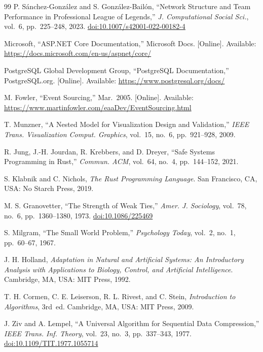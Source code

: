 \begin{thebibliography}{99}
P. Sánchez-González and S. González-Bailón,
``Network Structure and Team Performance in Professional League of Legends,''
\textit{J. Computational Social Sci.}, vol.~6, pp.~225--248, 2023.
\href{https://doi.org/10.1007/s42001-022-00182-4}{doi:10.1007/s42001-022-00182-4}

Microsoft, ``ASP.NET Core Documentation,'' Microsoft Docs. [Online]. Available:
\url{https://docs.microsoft.com/en-us/aspnet/core/}

PostgreSQL Global Development Group, ``PostgreSQL Documentation,''
PostgreSQL.org. [Online]. Available: \url{https://www.postgresql.org/docs/}

M. Fowler, ``Event Sourcing,'' Mar.\ 2005. [Online]. Available:
\url{https://www.martinfowler.com/eaaDev/EventSourcing.html}

T. Munzner, ``A Nested Model for Visualization Design and Validation,''
\textit{IEEE Trans. Visualization Comput. Graphics}, vol.~15, no.~6, pp.~921--928, 2009.

R. Jung, J.-H. Jourdan, R. Krebbers, and D. Dreyer,
``Safe Systems Programming in Rust,''
\textit{Commun. ACM}, vol.~64, no.~4, pp.~144--152, 2021.

S. Klabnik and C. Nichols, \textit{The Rust Programming Language}.
San Francisco, CA, USA: No Starch Press, 2019.

M. S. Granovetter, ``The Strength of Weak Ties,''
\textit{Amer. J. Sociology}, vol.~78, no.~6, pp.~1360--1380, 1973.
\href{https://doi.org/10.1086/225469}{doi:10.1086/225469}

S. Milgram, ``The Small World Problem,''
\textit{Psychology Today}, vol.~2, no.~1, pp.~60--67, 1967.

J. H. Holland, \textit{Adaptation in Natural and Artificial Systems:
An Introductory Analysis with Applications to Biology, Control, and Artificial Intelligence}.
Cambridge, MA, USA: MIT Press, 1992.

T. H. Cormen, C. E. Leiserson, R. L. Rivest, and C. Stein,
\textit{Introduction to Algorithms}, 3rd~ed.
Cambridge, MA, USA: MIT Press, 2009.

J. Ziv and A. Lempel, ``A Universal Algorithm for Sequential Data Compression,''
\textit{IEEE Trans. Inf. Theory}, vol.~23, no.~3, pp.~337--343, 1977.
\href{https://doi.org/10.1109/TIT.1977.1055714}{doi:10.1109/TIT.1977.1055714}


\end{thebibliography}
